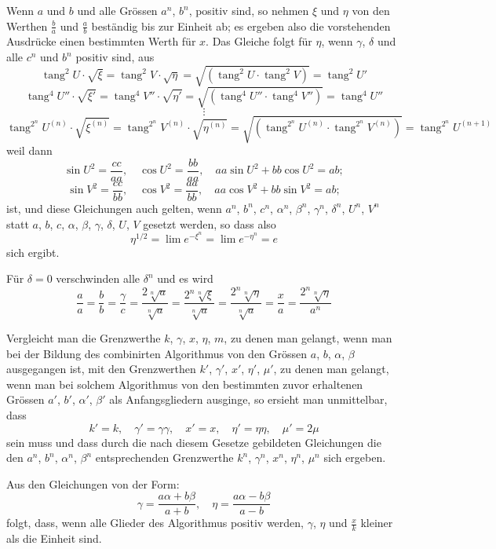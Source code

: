\documentclass[10pt,a4paper]{article}
\DeclareMathOperator{\tg}{tang}
\begin{document}
Wenn $a$ und $b$ und alle Grössen $a^n$, $b^n$, positiv sind, so nehmen $\xi$ und
$\eta$ von den Werthen $\frac{b}{a}$ und $\frac{a}{b}$ beständig bis zur Einheit ab; es ergeben also
die vorstehenden Ausdrücke einen bestimmten Werth für $x$. Das Gleiche folgt
für $\eta$, wenn $\gamma$, $\delta$ und alle $c^n$ und $b^n$ positiv sind, aus
\[
\tg^2 U \cdot \sqrt{\xi} = \tg^2 V \cdot \sqrt{\eta} = \sqrt{(\tg^2 U \cdot \tg^2 V)} = \tg^2 U'
\]
\[
\tg^4 U'' \cdot \sqrt{\xi'} = \tg^4 V'' \cdot \sqrt{\eta'} = \sqrt{(\tg^4 U'' \cdot \tg^4 V'')} = \tg^4 U''
\]
\[\vdots\]
\[
\tg^{2^n} U^{(n)} \cdot \sqrt{\xi^{(n)}} = \tg^{2^n} V^{(n)} \cdot \sqrt{\eta^{(n)}} = \sqrt{(\tg^{2^n} U^{(n)} \cdot \tg^{2^n} V^{(n)})} = \tg^{2^n} U^{(n+1)}
\]
weil dann
\[
\sin U^2 = \frac{cc}{aa}, \quad \cos U^2 = \frac{bb}{aa}, \quad aa\sin U^2 + bb\cos U^2 = ab;
\]
\[
\sin V^2 = \frac{cc}{bb}, \quad \cos V^2 = \frac{aa}{bb}, \quad aa\cos V^2 + bb\sin V^2 = ab;
\]
ist, und diese Gleichungen auch gelten, wenn $a^n$, $b^n$, $c^n$, $\alpha^n$, $\beta^n$, $\gamma^n$, $\delta^n$, $U^n$, $V^n$
statt $a$, $b$, $c$, $\alpha$, $\beta$, $\gamma$, $\delta$, $U$, $V$ gesetzt werden, so dass also
\[
\eta^{1/2} = \lim e^{-\xi^n} = \lim e^{-\eta^n} = e
\]
sich ergibt.

Für $\delta=0$ verschwinden alle $\delta^n$ und es wird
\[
\frac{a}{a}=\frac{b}{b}=\frac{\gamma}{c}=\frac{2\sqrt[n]{a}}{\sqrt[n]{a}}=\frac{2^n\sqrt[n]{\xi}}{\sqrt[n]{a}}=\frac{2^n\sqrt[n]{\eta}}{\sqrt[n]{a}}=\frac{x}{a}=\frac{2^n\sqrt[n]{\eta}}{a^n}
\]

Vergleicht man die Grenzwerthe $k$, $\gamma$, $x$, $\eta$, $m$, zu denen man gelangt, wenn
man bei der Bildung des combinirten Algorithmus von den Grössen $a$, $b$, $\alpha$, $\beta$
ausgegangen ist, mit den Grenzwerthen $k'$, $\gamma'$, $x'$, $\eta'$, $\mu'$, zu denen man gelangt,
wenn man bei solchem Algorithmus von den bestimmten zuvor erhaltenen Grössen
$a'$, $b'$, $\alpha'$, $\beta'$ als Anfangsgliedern ausginge, so ersieht man unmittelbar, dass
\[
k'=k, \quad \gamma'=\gamma\gamma, \quad x'=x, \quad \eta'=\eta\eta, \quad \mu'=2\mu
\]
sein muss und dass durch die nach diesem Gesetze gebildeten Gleichungen die
den $a^n$, $b^n$, $\alpha^n$, $\beta^n$ entsprechenden Grenzwerthe $k^n$, $\gamma^n$, $x^n$, $\eta^n$, $\mu^n$ sich ergeben.

Aus den Gleichungen von der Form:
\[
\gamma = \frac{a\alpha+b\beta}{a+b}, \quad \eta=\frac{a\alpha-b\beta}{a-b}
\]
folgt, dass, wenn alle Glieder des Algorithmus positiv werden, $\gamma$, $\eta$ und $\frac{x}{k}$ kleiner
als die Einheit sind.
\end{document}
